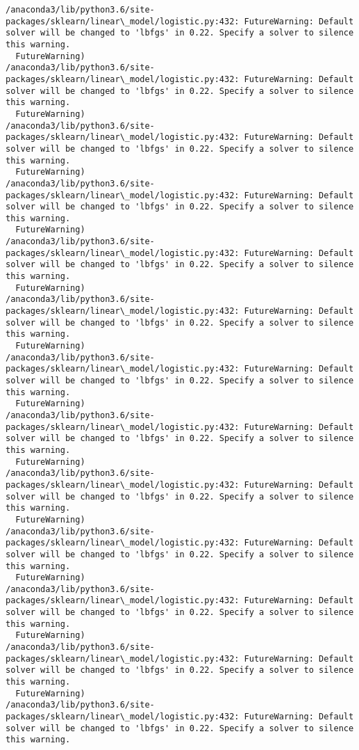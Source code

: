\documentclass[11pt]{article}
\begin{document}
\begin{Verbatim}[commandchars=\\\{\}]
/anaconda3/lib/python3.6/site-packages/sklearn/linear\_model/logistic.py:432: FutureWarning: Default solver will be changed to 'lbfgs' in 0.22. Specify a solver to silence this warning.
  FutureWarning)
/anaconda3/lib/python3.6/site-packages/sklearn/linear\_model/logistic.py:432: FutureWarning: Default solver will be changed to 'lbfgs' in 0.22. Specify a solver to silence this warning.
  FutureWarning)
/anaconda3/lib/python3.6/site-packages/sklearn/linear\_model/logistic.py:432: FutureWarning: Default solver will be changed to 'lbfgs' in 0.22. Specify a solver to silence this warning.
  FutureWarning)
/anaconda3/lib/python3.6/site-packages/sklearn/linear\_model/logistic.py:432: FutureWarning: Default solver will be changed to 'lbfgs' in 0.22. Specify a solver to silence this warning.
  FutureWarning)
/anaconda3/lib/python3.6/site-packages/sklearn/linear\_model/logistic.py:432: FutureWarning: Default solver will be changed to 'lbfgs' in 0.22. Specify a solver to silence this warning.
  FutureWarning)
/anaconda3/lib/python3.6/site-packages/sklearn/linear\_model/logistic.py:432: FutureWarning: Default solver will be changed to 'lbfgs' in 0.22. Specify a solver to silence this warning.
  FutureWarning)
/anaconda3/lib/python3.6/site-packages/sklearn/linear\_model/logistic.py:432: FutureWarning: Default solver will be changed to 'lbfgs' in 0.22. Specify a solver to silence this warning.
  FutureWarning)
/anaconda3/lib/python3.6/site-packages/sklearn/linear\_model/logistic.py:432: FutureWarning: Default solver will be changed to 'lbfgs' in 0.22. Specify a solver to silence this warning.
  FutureWarning)
/anaconda3/lib/python3.6/site-packages/sklearn/linear\_model/logistic.py:432: FutureWarning: Default solver will be changed to 'lbfgs' in 0.22. Specify a solver to silence this warning.
  FutureWarning)
/anaconda3/lib/python3.6/site-packages/sklearn/linear\_model/logistic.py:432: FutureWarning: Default solver will be changed to 'lbfgs' in 0.22. Specify a solver to silence this warning.
  FutureWarning)
/anaconda3/lib/python3.6/site-packages/sklearn/linear\_model/logistic.py:432: FutureWarning: Default solver will be changed to 'lbfgs' in 0.22. Specify a solver to silence this warning.
  FutureWarning)
/anaconda3/lib/python3.6/site-packages/sklearn/linear\_model/logistic.py:432: FutureWarning: Default solver will be changed to 'lbfgs' in 0.22. Specify a solver to silence this warning.
  FutureWarning)
/anaconda3/lib/python3.6/site-packages/sklearn/linear\_model/logistic.py:432: FutureWarning: Default solver will be changed to 'lbfgs' in 0.22. Specify a solver to silence this warning.

\end{Verbatim}
\end{document}
